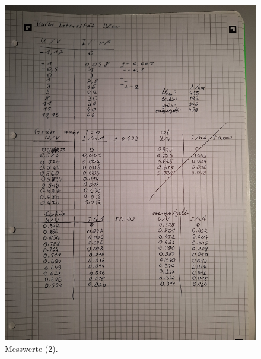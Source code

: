 \begin{figure}
    \caption{Messwerte (2).}
    \centering
    \includegraphics[width=\textwidth, angle=-90]{"Bilder/mw2.jpg"}
\end{figure}